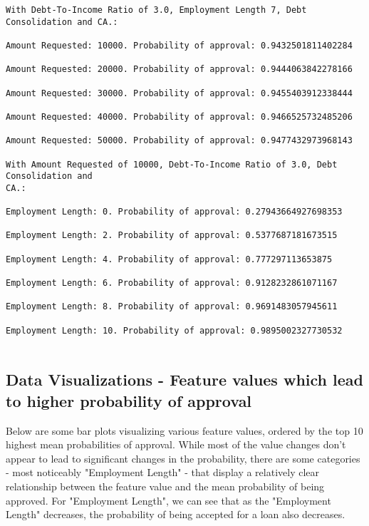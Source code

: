 \documentclass[11pt]{article}
\begin{document}
    \begin{Verbatim}[commandchars=\\\{\},fontsize=\footnotesize]
With Debt-To-Income Ratio of 3.0, Employment Length 7, Debt Consolidation and CA.:

Amount Requested: 10000. Probability of approval: 0.9432501811402284

Amount Requested: 20000. Probability of approval: 0.9444063842278166

Amount Requested: 30000. Probability of approval: 0.9455403912338444

Amount Requested: 40000. Probability of approval: 0.9466525732485206

Amount Requested: 50000. Probability of approval: 0.9477432973968143

With Amount Requested of 10000, Debt-To-Income Ratio of 3.0, Debt Consolidation and
CA.:

Employment Length: 0. Probability of approval: 0.27943664927698353

Employment Length: 2. Probability of approval: 0.5377687181673515

Employment Length: 4. Probability of approval: 0.777297113653875

Employment Length: 6. Probability of approval: 0.9128232861071167

Employment Length: 8. Probability of approval: 0.9691483057945611

Employment Length: 10. Probability of approval: 0.9895002327730532


    \end{Verbatim}

        \subsection{Data Visualizations - Feature values which lead to higher probability of
approval}

Below are some bar plots visualizing various feature values, ordered by
the top 10 highest mean probabilities of approval. While most of the
value changes don't appear to lead to significant changes in the
probability, there are some categories - most noticeably "Employment
Length" - that display a relatively clear relationship between the
feature value and the mean probability of being approved. For
"Employment Length", we can see that as the "Employment Length"
decreases, the probability of being accepted for a loan also decreases.\\
\end{document}
